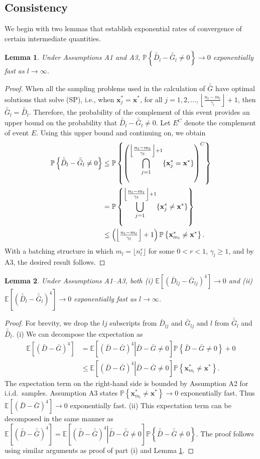 \documentclass[12pt]{article}
\newtheorem{lemma}{Lemma}
\newcommand{\p}[1]{\mathbb{P} \left\{ #1 \right\}}
\newcommand{\e}[1]{\mathbb{E} \left[ #1 \right]
}
\newcommand{\x}{\mathbf{x}}
\newcommand{\xs}{\x^*}
\newcommand{\nbl}{\left\lfloor\tfrac{n_l-m_l}{\gamma_l}\right\rfloor+1}
\newcommand{\gb}{\bar{G}}
\newcommand{\gbb}{\bar{\gb}}
\newcommand{\db}{\bar{D}}
\newcommand{\dbb}{\bar{\db}}
\begin{document}
\subsection{Consistency}
\label{subsec:conv} 

We begin with two lemmas that establish exponential rates of convergence of certain intermediate quantities.

\begin{lemma} \label{lem:gbb_prob}
	Under Assumptions A1 and A3, $\p{\dbb_l - \gbb_l \neq 0} \rightarrow 0$ exponentially fast as $l \rightarrow \infty$.
\end{lemma}

\begin{proof} When all the sampling problems used in the calculation of $\gbb$ have optimal solutions that solve (SP), i.e., when $\xs_{j} = \xs$, for all $j=1,2,\ldots, \nbl$, then $\gbb_l = \dbb_l$. 
Therefore, the probability of the complement of this event provides an upper bound on the probability that $\dbb_l - \gbb_l \neq 0$. 
Let $E^C$ denote the complement of event $E$. 
Using this upper bound and continuing on, we obtain
	\begin{align}
		\p{\dbb_l - \gbb_l \neq 0} & \leq \p{\left( \bigcap_{j=1}^{\nbl} \{\xs_{j} = \xs\} \right)^C} \notag \\
		& = \p{ \bigcup_{j=1}^{\nbl} \{\xs_{j} \neq \xs\}} \notag \\
		& \leq \left( \nbl\right) \p{ \xs_{m_l} \neq \xs }. \notag
	\end{align}
	With a batching structure in which $m_l = \lfloor n_l^{r} \rfloor$ for some $0<r<1$,  $\gamma_l \geq 1$, and by A3, the desired result follows.
\end{proof}

\begin{lemma} \label{lem:gb_gbb_l4}
	Under Assumptions A1--A3, both (i) $\e{(\db_{lj} - \gb_{lj})^4} \rightarrow 0$ and (ii) $\e{(\dbb_l - \gbb_l)^4} \rightarrow 0$ exponentially fast as $l \rightarrow \infty$.
\end{lemma}

\begin{proof}
	For brevity, we drop the $lj$ subscripts from $\db_{lj}$ and $\gb_{lj}$ and $l$ from $\gbb_l$ and $\dbb_l$.
	(i) We can decompose the expectation as
	\begin{align*}
		\e{(\db - \gb)^4} & = \e{ \left.(\db - \gb)^4 \right| \db - \gb \neq 0} \p{\db - \gb \neq 0} + 0\\
		& \leq \e{ \left.(\db - \gb)^4 \right| \db - \gb \neq 0} \p{ \xs_{m_l}  \neq \xs}.
	\end{align*}
	The expectation term on the right-hand side is bounded by Assumption A2 for i.i.d.\ samples.  
        Assumption A3 states $\p{\xs_{m_l} \neq \xs} \rightarrow 0$ exponentially fast.  
        Thus $\e{(\db - \gb)^4} \rightarrow 0$ exponentially fast.
(ii) This expectation term can be decomposed in the same manner as
$
		\e{(\dbb - \gbb)^4}  = \e{\left. (\dbb - \gbb)^4 \right| \dbb - \gbb \neq 0} \p{\dbb - \gbb \neq 0}.
$ 
	The proof follows using similar arguments as proof of part (i) and Lemma \ref{lem:gbb_prob}.
\end{proof}
\end{document}
